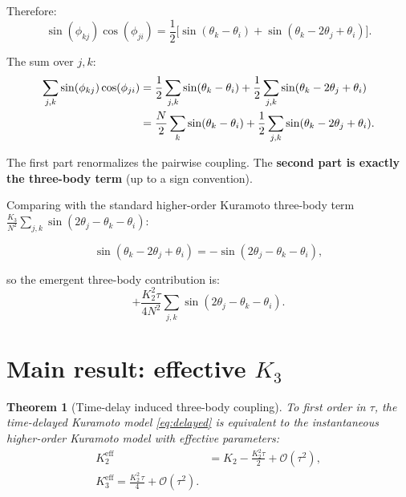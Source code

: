 \documentclass[11pt]{article}
\newcommand{\Order}{\mathcal{O}}
\newtheorem{theorem}{Theorem}
\begin{document}
Therefore:
\begin{equation}
  \sin(\phi_{kj})\cos(\phi_{ji})
  = \frac{1}{2}\bigl[\sin(\theta_k - \theta_i)
    + \sin(\theta_k - 2\theta_j + \theta_i)\bigr].
\end{equation}

The sum over $j,k$:
\begin{align}
  \sum_{j,k}\sin(\phi_{kj})\cos(\phi_{ji})
  &= \frac{1}{2}\sum_{j,k}\sin(\theta_k-\theta_i)
    + \frac{1}{2}\sum_{j,k}\sin(\theta_k - 2\theta_j + \theta_i) \notag\\
  &= \frac{N}{2}\sum_k\sin(\theta_k-\theta_i)
    + \frac{1}{2}\sum_{j,k}\sin(\theta_k - 2\theta_j + \theta_i).
  \label{eq:triplet-emergence}
\end{align}

The first part renormalizes the pairwise coupling.  The \textbf{second part is
exactly the three-body term} (up to a sign convention).

Comparing with the standard higher-order Kuramoto three-body term
$\frac{K_3}{N^2}\sum_{j,k}\sin(2\theta_j - \theta_k - \theta_i)$:

\begin{equation}
  \sin(\theta_k - 2\theta_j + \theta_i) = -\sin(2\theta_j - \theta_k - \theta_i),
\end{equation}

so the emergent three-body contribution is:
\begin{equation}
  +\frac{K_2^2\tau}{4N^2}\sum_{j,k}\sin(2\theta_j - \theta_k - \theta_i).
\end{equation}

\section{Main result: effective $K_3$}

\begin{theorem}[Time-delay induced three-body coupling]
\label{thm:K3-eff}
  To first order in $\tau$, the time-delayed Kuramoto model
  \eqref{eq:delayed} is equivalent to the instantaneous higher-order Kuramoto
  model with effective parameters:
  \begin{align}
    K_2^{\mathrm{eff}} &= K_2 - \frac{K_2^2\tau}{2}
      + \Order(\tau^2), \label{eq:K2-eff} \\
    \boxed{K_3^{\mathrm{eff}} = \frac{K_2^2\,\tau}{4}
      + \Order(\tau^2).} \label{eq:K3-eff}
  \end{align}
\end{theorem}
\end{document}
